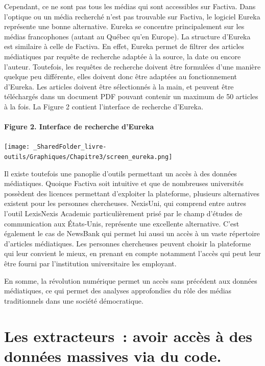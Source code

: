\documentclass[
  letterpaper,
]{scrbook}
\let\oldparagraph\paragraph
\renewcommand{\paragraph}[1]{\oldparagraph{#1}\mbox{}}
\begin{document}
Cependant, ce ne sont pas tous les médias qui sont accessibles sur
Factiva. Dans l'optique ou un média recherché n'est pas trouvable sur
Factiva, le logiciel Eureka représente une bonne alternative. Eureka se
concentre principalement sur les médias francophones (autant au Québec
qu'en Europe). La structure d'Eureka est similaire à celle de Factiva.
En effet, Eureka permet de filtrer des articles médiatiques par requête
de recherche adaptée à la source, la date ou encore l'auteur. Toutefois,
les requêtes de recherche doivent être formulées d'une manière quelque
peu différente, elles doivent donc être adaptées au fonctionnement
d'Eureka. Les articles doivent être sélectionnés à la main, et peuvent
être téléchargés dans un document PDF pouvant contenir un maximum de 50
articles à la fois. La Figure 2 contient l'interface de recherche
d'Eureka.

\hypertarget{figure-2.-interface-de-recherche-deureka}{%
\paragraph{Figure 2. Interface de recherche
d'Eureka}\label{figure-2.-interface-de-recherche-deureka}}

\texttt{[image: \_SharedFolder\_livre-outils/Graphiques/Chapitre3/screen\_eureka.png]}

Il existe toutefois une panoplie d'outils permettant un accès à des
données médiatiques. Quoique Factiva soit intuitive et que de nombreuses
universités possèdent des licences permettant d'exploiter la plateforme,
plusieurs alternatives existent pour les personnes chercheuses.
NexisUni, qui comprend entre autres l'outil LexisNexis Academic
particulièrement prisé par le champ d'études de communication aux
États-Unis, représente une excellente alternative. C'est également le
cas de NewsBank qui permet lui aussi un accès à un vaste répertoire
d'articles médiatiques. Les personnes chercheuses peuvent choisir la
plateforme qui leur convient le mieux, en prenant en compte notamment
l'accès qui peut leur être fourni par l'institution universitaire les
employant.

En somme, la révolution numérique permet un accès sans précédent aux
données médiatiques, ce qui permet des analyses approfondies du rôle des
médias traditionnels dans une société démocratique.

\hypertarget{les-extracteurs-avoir-accuxe8s-uxe0-des-donnuxe9es-massives-via-du-code.}{%
\section{\texorpdfstring{\textbf{Les extracteurs~: avoir accès à des
données massives via du
code.}}{Les extracteurs~: avoir accès à des données massives via du code.}}\label{les-extracteurs-avoir-accuxe8s-uxe0-des-donnuxe9es-massives-via-du-code.}}
\end{document}
